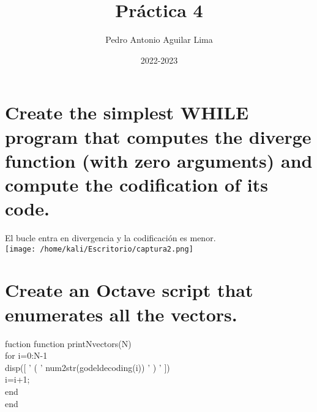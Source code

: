 \documentclass[11pt]{article}
\title{\textbf{Práctica 4}}
\author{Pedro Antonio Aguilar Lima}
\date{2022-2023}
\begin{document}
\maketitle
\thispagestyle{empty}

\section{Create the simplest WHILE program that computes the diverge function (with zero arguments) and compute the codification of its code.}


\begin{whilecode}[H]





\end{whilecode}

El bucle entra en divergencia y la codificación es menor.
\\

\texttt{[image: /home/kali/Escritorio/captura2.png]}

\newpage

\section{Create an Octave script that enumerates all the vectors.}

\begin{whilecode}[H]

fuction function printNvectors(N)
\\
\hspace{0.5cm}   for i=0:N-1
\\
\hspace{1cm}     disp([ ' ( ' num2str(godeldecoding(i)) ' ) ' ])
\\
\hspace{1cm} i=i+1;
\\
\hspace{0.75cm} end
\\
end
\\







\end{whilecode}
\end{document}
